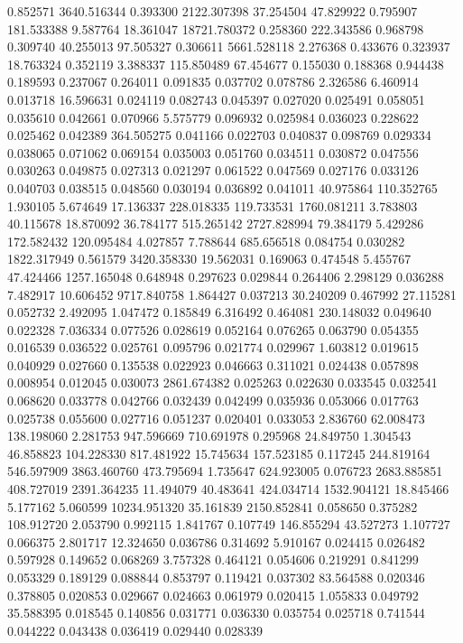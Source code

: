 0.852571
3640.516344
0.393300
2122.307398
37.254504
47.829922
0.795907
181.533388
9.587764
18.361047
18721.780372
0.258360
222.343586
0.968798
0.309740
40.255013
97.505327
0.306611
5661.528118
2.276368
0.433676
0.323937
18.763324
0.352119
3.388337
115.850489
67.454677
0.155030
0.188368
0.944438
0.189593
0.237067
0.264011
0.091835
0.037702
0.078786
2.326586
6.460914
0.013718
16.596631
0.024119
0.082743
0.045397
0.027020
0.025491
0.058051
0.035610
0.042661
0.070966
5.575779
0.096932
0.025984
0.036023
0.228622
0.025462
0.042389
364.505275
0.041166
0.022703
0.040837
0.098769
0.029334
0.038065
0.071062
0.069154
0.035003
0.051760
0.034511
0.030872
0.047556
0.030263
0.049875
0.027313
0.021297
0.061522
0.047569
0.027176
0.033126
0.040703
0.038515
0.048560
0.030194
0.036892
0.041011
40.975864
110.352765
1.930105
5.674649
17.136337
228.018335
119.733531
1760.081211
3.783803
40.115678
18.870092
36.784177
515.265142
2727.828994
79.384179
5.429286
172.582432
120.095484
4.027857
7.788644
685.656518
0.084754
0.030282
1822.317949
0.561579
3420.358330
19.562031
0.169063
0.474548
5.455767
47.424466
1257.165048
0.648948
0.297623
0.029844
0.264406
2.298129
0.036288
7.482917
10.606452
9717.840758
1.864427
0.037213
30.240209
0.467992
27.115281
0.052732
2.492095
1.047472
0.185849
6.316492
0.464081
230.148032
0.049640
0.022328
7.036334
0.077526
0.028619
0.052164
0.076265
0.063790
0.054355
0.016539
0.036522
0.025761
0.095796
0.021774
0.029967
1.603812
0.019615
0.040929
0.027660
0.135538
0.022923
0.046663
0.311021
0.024438
0.057898
0.008954
0.012045
0.030073
2861.674382
0.025263
0.022630
0.033545
0.032541
0.068620
0.033778
0.042766
0.032439
0.042499
0.035936
0.053066
0.017763
0.025738
0.055600
0.027716
0.051237
0.020401
0.033053
2.836760
62.008473
138.198060
2.281753
947.596669
710.691978
0.295968
24.849750
1.304543
46.858823
104.228330
817.481922
15.745634
157.523185
0.117245
244.819164
546.597909
3863.460760
473.795694
1.735647
624.923005
0.076723
2683.885851
408.727019
2391.364235
11.494079
40.483641
424.034714
1532.904121
18.845466
5.177162
5.060599
10234.951320
35.161839
2150.852841
0.058650
0.375282
108.912720
2.053790
0.992115
1.841767
0.107749
146.855294
43.527273
1.107727
0.066375
2.801717
12.324650
0.036786
0.314692
5.910167
0.024415
0.026482
0.597928
0.149652
0.068269
3.757328
0.464121
0.054606
0.219291
0.841299
0.053329
0.189129
0.088844
0.853797
0.119421
0.037302
83.564588
0.020346
0.378805
0.020853
0.029667
0.024663
0.061979
0.020415
1.055833
0.049792
35.588395
0.018545
0.140856
0.031771
0.036330
0.035754
0.025718
0.741544
0.044222
0.043438
0.036419
0.029440
0.028339
